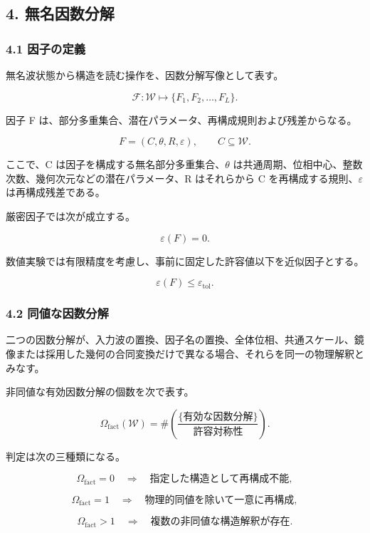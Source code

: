 \documentclass[
  a4paper,
]{ltjsarticle}
\begin{document}
\subsection{4. 無名因数分解}\label{ux7121ux540dux56e0ux6570ux5206ux89e3}

\subsubsection{4.1 因子の定義}\label{ux56e0ux5b50ux306eux5b9aux7fa9}

無名波状態から構造を読む操作を、因数分解写像として表す。

\[
\mathcal F:
\mathcal W
\longmapsto
\{F_1,F_2,\ldots,F_L\}.
\]

因子 F は、部分多重集合、潜在パラメータ、再構成規則および残差からなる。

\[
F
=
(C,\theta,R,\varepsilon),
\qquad
C\subseteq\mathcal W.
\]

ここで、C は因子を構成する無名部分多重集合、\(\theta\)
は共通周期、位相中心、整数次数、幾何次元などの潜在パラメータ、R
はそれらから C を再構成する規則、\(\varepsilon\) は再構成残差である。

厳密因子では次が成立する。

\[
\varepsilon(F)=0.
\]

数値実験では有限精度を考慮し、事前に固定した許容値以下を近似因子とする。

\[
\varepsilon(F)\leq\varepsilon_{\mathrm{tol}}.
\]

\subsubsection{4.2
同値な因数分解}\label{ux540cux5024ux306aux56e0ux6570ux5206ux89e3}

二つの因数分解が、入力波の置換、因子名の置換、全体位相、共通スケール、鏡像または採用した幾何の合同変換だけで異なる場合、それらを同一の物理解釈とみなす。

非同値な有効因数分解の個数を次で表す。

\[
\Omega_{\mathrm{fact}}(\mathcal W)
=
\#\left(
\frac{\{\text{有効な因数分解}\}}
{\text{許容対称性}}
\right).
\]

判定は次の三種類になる。

\[
\Omega_{\mathrm{fact}}=0
\quad\Longrightarrow\quad
\text{指定した構造として再構成不能},
\]

\[
\Omega_{\mathrm{fact}}=1
\quad\Longrightarrow\quad
\text{物理的同値を除いて一意に再構成},
\]

\[
\Omega_{\mathrm{fact}}>1
\quad\Longrightarrow\quad
\text{複数の非同値な構造解釈が存在}.
\]
\end{document}
